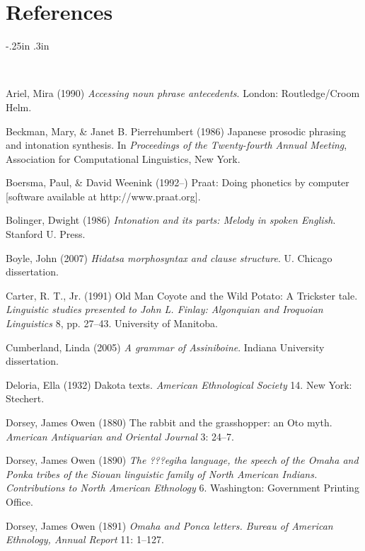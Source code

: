 \documentclass[output=paper]{LSP/langsci}
\begin{document}
\section*{References}

\newenvironment{reflist} {\begin{list} {} {\listparindent -.25in
\leftmargin .3in} \item \ \vspace{-.3in} } {\end{list} }

\begin{reflist}

Ariel, Mira (1990) \emph{Accessing noun phrase antecedents}. London: Routledge/Croom Helm. 

Beckman, Mary, \& Janet B. Pierrehumbert (1986) Japanese prosodic phrasing and intonation synthesis. In \emph{Proceedings of the Twenty-fourth Annual Meeting}, Association for Computational Linguistics, New York.

Boersma, Paul, \& David Weenink (1992--) Praat: Doing phonetics by computer [software available at http://www.praat.org].

Bolinger, Dwight (1986) \emph{Intonation and its parts: Melody in spoken English}. Stanford U. Press.

Boyle, John (2007) \emph{Hidatsa morphosyntax and clause structure}. U. Chicago dissertation.

Carter, R. T., Jr. (1991) Old Man Coyote and the Wild Potato: A Trickster tale. \emph{Linguistic studies presented to John L. Finlay: Algonquian and Iroquoian Linguistics} 8, pp. 27--43. University of Manitoba.

Cumberland, Linda (2005) \emph{A grammar of Assiniboine}. Indiana University dissertation.

Deloria, Ella (1932) Dakota texts. \emph{American Ethnological Society} 14. New York: Stechert.

Dorsey, James Owen (1880) The rabbit and the grasshopper: an Oto myth. \emph{American Antiquarian and Oriental Journal} 3: 24--7.

Dorsey, James Owen (1890) \emph{The ???egiha language, the speech of the Omaha and Ponka tribes of the Siouan linguistic family of North American Indians. Contributions to North American Ethnology} 6. Washington: Government Printing Office.

Dorsey, James Owen (1891) \emph{Omaha and Ponca letters. Bureau of American Ethnology, Annual Report} 11: 1--127.


\end{reflist}
\end{document}
